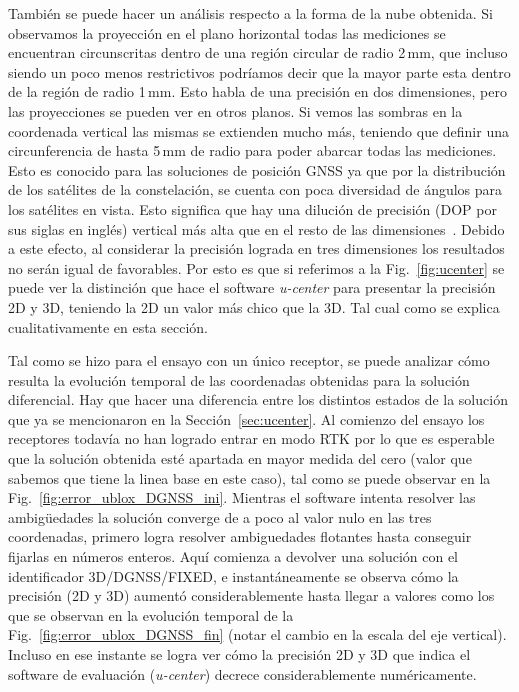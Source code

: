 \documentclass[a4paper,12pt,oneside,onecolumn,final,openright]{book}%
\begin{document}
	También se puede hacer un análisis respecto a la forma de la nube obtenida. Si observamos la proyección en el plano horizontal todas las mediciones se encuentran circunscritas dentro de una región circular de radio 2\,mm, que incluso siendo un poco menos restrictivos podríamos decir que la mayor parte esta dentro de la región de radio 1\,mm. Esto habla de una precisión en dos dimensiones, pero las proyecciones se pueden ver en otros planos. Si vemos las sombras en la coordenada vertical las mismas se extienden mucho más, teniendo que definir una circunferencia de hasta 5\,mm de radio para poder abarcar todas las mediciones. Esto es conocido para las soluciones de posición GNSS ya que por la distribución de los satélites de la constelación, se cuenta con poca diversidad de ángulos para los satélites en vista. Esto significa que hay una dilución de precisión (DOP por sus siglas en inglés) vertical más alta que en el resto de las dimensiones~\cite{kaplan}. Debido a este efecto, al considerar la precisión lograda en tres dimensiones los resultados no serán igual de favorables. Por esto es que si referimos a la Fig.~\ref{fig:ucenter} se puede ver la distinción que hace el software \textit{u-center} para presentar la precisión 2D y 3D, teniendo la 2D un valor más chico que la 3D. Tal cual como se explica cualitativamente en esta sección.
	
	Tal como se hizo para el ensayo con un único receptor, se puede analizar cómo resulta la evolución temporal de las coordenadas obtenidas para la solución diferencial. Hay que hacer una diferencia entre los distintos estados de la solución que ya se mencionaron en la Sección~\ref{sec:ucenter}. Al comienzo del ensayo los receptores todavía no han logrado entrar en modo RTK por lo que es esperable que la solución obtenida esté apartada en mayor medida del cero (valor que sabemos que tiene la linea base en este caso), tal como se puede observar en la Fig.~\ref{fig:error_ublox_DGNSS_ini}. Mientras el software intenta resolver las ambigüedades la solución converge de a poco al valor nulo en las tres coordenadas, primero logra resolver ambiguedades flotantes hasta conseguir fijarlas en números enteros. Aquí comienza a devolver una solución con el identificador 3D/DGNSS/FIXED, e instantáneamente se observa cómo la precisión (2D y 3D) aumentó considerablemente hasta llegar a valores como los que se observan en la evolución temporal de la Fig.~\ref{fig:error_ublox_DGNSS_fin} (notar el cambio en la escala del eje vertical). Incluso en ese instante se logra ver cómo la precisión 2D y 3D que indica el software de evaluación (\textit{u-center}) decrece considerablemente numéricamente.
	
\end{document}
